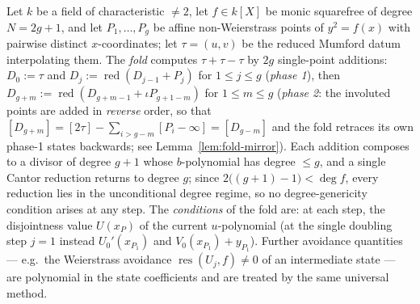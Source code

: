 \begin{definition}
\label{def:centre-fold}
\leanok
Let $k$ be a field of characteristic $\neq 2$, let $f \in k[X]$ be monic squarefree of
degree $N = 2g+1$, and let $P_1, \dots, P_g$ be affine non-Weierstrass points of
$y^2 = f(x)$ with pairwise distinct $x$-coordinates; let $\tau = (u, v)$ be the reduced
Mumford datum interpolating them. The \emph{fold} computes $\tau + \tau - \tau$ by $2g$
single-point additions: $D_0 := \tau$ and $D_j := \operatorname{red}(D_{j-1} + P_j)$ for
$1 \le j \le g$ (\emph{phase 1}), then
$D_{g+m} := \operatorname{red}(D_{g+m-1} + \iota P_{g+1-m})$ for $1 \le m \le g$
(\emph{phase 2}: the involuted points are added in \emph{reverse} order, so that
$[D_{g+m}] = [2\tau] - \sum_{i > g-m}[P_i - \infty] = [D_{g-m}]$ and the fold retraces
its own phase-1 states backwards; see Lemma~\ref{lem:fold-mirror}). Each addition
composes to a divisor of degree $g+1$ whose $b$-polynomial has degree $\le g$, and a
single Cantor reduction returns to degree $g$; since $2\bigl((g+1)-1\bigr) < \deg f$,
every reduction lies in the unconditional degree regime, so no degree-genericity
condition arises at any step. The \emph{conditions} of the fold are: at each step, the
disjointness value $U(x_P)$ of the current $u$-polynomial (at the single doubling step
$j = 1$ instead $U_0'(x_{P_1})$ and $V_0(x_{P_1}) + y_{P_1}$). Further avoidance
quantities --- e.g.\ the Weierstrass avoidance $\operatorname{res}(U_j, f) \neq 0$ of an
intermediate state --- are polynomial in the state coefficients and are treated by the
same universal method.
\end{definition}


